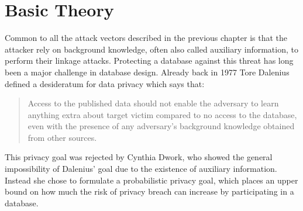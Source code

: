 
\chapter{Basic Theory}

Common to all the attack vectors described in the previous chapter is that the attacker rely on background knowledge, often also called auxiliary information, to perform their linkage attacks. Protecting a database against this threat has long been a major challenge in database design. Already back in 1977 Tore Dalenius \cite{dalenius1977towards} defined a desideratum for data privacy which says that: \begin{quote}
	Access to the published data should not enable the adversary to learn anything extra about target victim compared to no access to the database, even with the presence of any adversary’s background knowledge obtained from other sources.
\end{quote} 

This privacy goal was rejected by Cynthia Dwork, who showed the general impossibility of Dalenius' goal due to the existence of auxiliary information. Instead she chose to formulate a probabilistic privacy goal, which places an upper bound on how much the risk of privacy breach can increase by participating in a database.

%

